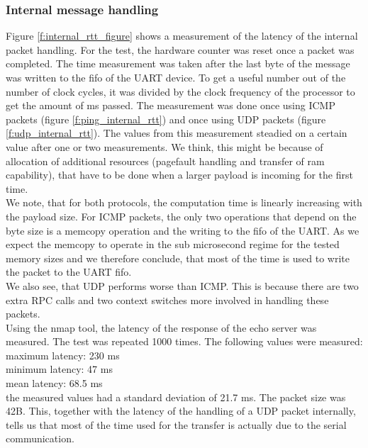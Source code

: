 \subsubsection{Internal message handling \label{ss:network_internal_message_handling}}
Figure \ref{f:internal_rtt_figure} shows a measurement of the latency of the internal packet handling. For the test, the hardware counter was reset once a packet was completed. The time measurement was taken after the last byte of the message was written to the fifo of the UART device. To get a useful number out of the number of clock cycles, it was divided by the clock frequency of the processor to get the amount of ms passed. The measurement was done once using ICMP packets (figure \ref{f:ping_internal_rtt}) and once using UDP packets (figure \ref{f:udp_internal_rtt}). The values from this measurement steadied on a certain value after one or two measurements. We think, this might be because of allocation of additional resources (pagefault handling and transfer of ram capability), that have to be done when a larger payload is incoming for the first time. \\
We note, that for both protocols, the computation time is linearly increasing with the payload size. For ICMP packets, the only two operations that depend on the byte size is a memcopy operation and the writing to the fifo of the UART. As we expect the memcopy to operate in the sub microsecond regime for the tested memory sizes and we therefore conclude, that most of the time is used to write the packet to the UART fifo. \\
We also see, that UDP performs worse than ICMP. This is because there are two extra RPC calls and two context switches more involved in handling these packets. \\
Using the nmap tool, the latency of the response of the echo server was measured. The test was repeated 1000 times. The following values were measured:\\
maximum latency: 230 ms\\
minimum latency: 47 ms\\
mean latency: 68.5 ms\\
the measured values had a standard deviation of 21.7 ms. The packet size was 42B. This, together with the latency of the handling of a UDP packet internally, tells us that most of the time used for the transfer is actually due to the serial communication.

